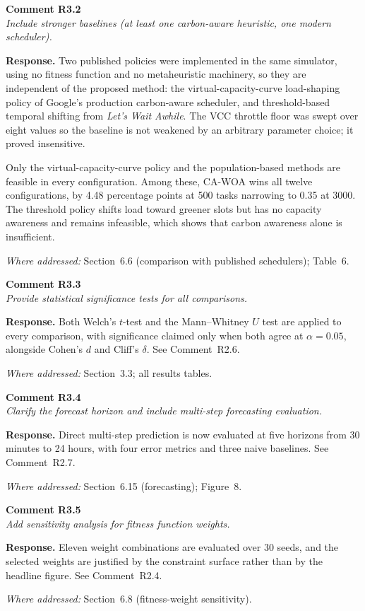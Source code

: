 \documentclass[11pt,a4paper]{article}
\newcommand{\rsp}[1]{\vspace{2pt}\noindent\textbf{Response.} #1\par\vspace{6pt}}
\newcommand{\rwhere}[1]{\noindent\textit{Where addressed:} #1\par\vspace{10pt}}
\newenvironment{revcomment}[1]
  {\begin{tcolorbox}[colback=gray!6,colframe=gray!45,boxrule=0.4pt,
     left=6pt,right=6pt,top=4pt,bottom=4pt]\textbf{#1}\\[2pt]\itshape\color{cmt}}
  {\end{tcolorbox}\vspace{4pt}}
\begin{document}
\begin{revcomment}{Comment R3.2}
Include stronger baselines (at least one carbon-aware heuristic, one modern
scheduler).
\end{revcomment}
\rsp{Two published policies were implemented in the same simulator, using no fitness
function and no metaheuristic machinery, so they are independent of the proposed
method: the virtual-capacity-curve load-shaping policy of Google's production
carbon-aware scheduler, and threshold-based temporal shifting from
\emph{Let's Wait Awhile}. The VCC throttle floor was swept over eight values so the
baseline is not weakened by an arbitrary parameter choice; it proved insensitive.

Only the virtual-capacity-curve policy and the population-based methods are
feasible in every configuration. Among these, CA-WOA wins all twelve
configurations, by 4.48 percentage points at 500 tasks narrowing to 0.35 at 3000.
The threshold policy shifts load toward greener slots but has no capacity
awareness and remains infeasible, which shows that carbon awareness alone is
insufficient.}
\rwhere{Section~6.6 (comparison with published schedulers); Table~6.}

\begin{revcomment}{Comment R3.3}
Provide statistical significance tests for all comparisons.
\end{revcomment}
\rsp{Both Welch's $t$-test and the Mann--Whitney $U$ test are applied to every
comparison, with significance claimed only when both agree at $\alpha = 0.05$,
alongside Cohen's $d$ and Cliff's $\delta$. See Comment~R2.6.}
\rwhere{Section~3.3; all results tables.}

\begin{revcomment}{Comment R3.4}
Clarify the forecast horizon and include multi-step forecasting evaluation.
\end{revcomment}
\rsp{Direct multi-step prediction is now evaluated at five horizons from 30 minutes
to 24 hours, with four error metrics and three naive baselines. See
Comment~R2.7.}
\rwhere{Section~6.15 (forecasting); Figure~8.}

\begin{revcomment}{Comment R3.5}
Add sensitivity analysis for fitness function weights.
\end{revcomment}
\rsp{Eleven weight combinations are evaluated over 30 seeds, and the selected weights
are justified by the constraint surface rather than by the headline figure. See
Comment~R2.4.}
\rwhere{Section~6.8 (fitness-weight sensitivity).}
\end{document}
